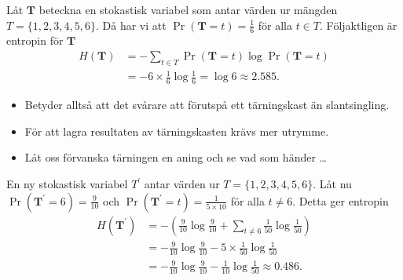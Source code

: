 \documentclass{beamer}
\theoremstyle{definition}
\let\stoch\mathbf{}
\begin{document}
\begin{frame}{\insertsubsectionhead}
  \begin{example}
    Låt \(\stoch T\) beteckna en stokastisk variabel som antar värden ur 
    mängden \(T = \{1, 2, 3, 4, 5, 6\}\).
    Då har vi att \(\Pr(\stoch T = t) = \frac{1}{6}\) för alla \(t\in T\).
    Följaktligen är entropin för \(\stoch T\)
    \begin{align*}
      H(\stoch T) &= -\sum_{t\in T} \Pr(\stoch T = t)\log\Pr(\stoch T = t) \\
      &= -6\times \frac{1}{6}\log\frac{1}{6} = \log 6 \approx 2.585.
    \end{align*}
  \end{example}
\end{frame}

\begin{frame}{\insertsubsectionhead}
  \begin{itemize}
    \item Betyder alltså att det svårare att förutspå ett tärningskast än 
      slantsingling.

    \item För att lagra resultaten av tärningskasten krävs mer utrymme.

    \item Låt oss förvanska tärningen en aning och se vad som händer \dots
  \end{itemize}
\end{frame}

\begin{frame}{\insertsubsectionhead}
  \begin{example}
    En ny stokastisk variabel \(T^\prime\) antar värden ur \(T = \{1, 2, 3, 4, 
    5, 6\}\).
    Låt nu \(\Pr(\stoch T^\prime = 6) = \frac{9}{10}\) och \(\Pr(\stoch 
    T^\prime = t) = \frac{1}{5\times 10}\) för alla \(t\neq 6\).
    Detta ger entropin
    \begin{align*}
      H(\stoch T^\prime) &= -\left( \frac{9}{10}\log\frac{9}{10} + \sum_{t\neq 
      6} \frac{1}{50}\log\frac{1}{50} \right) \\
        &= -\frac{9}{10}\log\frac{9}{10} -5\times\frac{1}{50}\log\frac{1}{50} 
        \\
        &= -\frac{9}{10}\log\frac{9}{10} -\frac{1}{10}\log\frac{1}{50} \approx 
        0.486.
    \end{align*}
  \end{example}
\end{frame}
\end{document}
